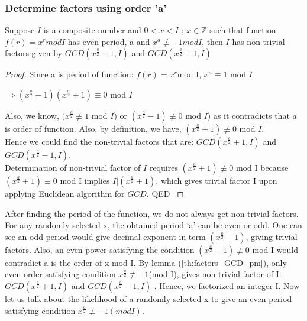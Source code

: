 \subsubsection{Determine factors using order 'a'}

 
\begin{theorem}
    Suppose $I$ is a composite number and $0<x< I$ ; $x \in \mathbb{Z}$ such that function $f(r)=x^r mod I$ has even period, a and $x^a \not \equiv -1 mod I$, then $I$ has non trivial factors given by $GCD(x^{\frac{a}{2}} -1, I ) $ and $GCD(x^{\frac{a}{2}} +1, I )$ \cite{Nielsen2002}
    \label{th:factors_GCD_pm}
\end{theorem}
\begin{proof}
    Since a is period of function: $f(r)=x^r $mod I, $x^a \equiv 1$ mod $I$ 
    \begin{center}
         $\Rightarrow (x^{\frac{a}{2}}-1) (x^{\frac{a}{2}} +1)\equiv 0$ mod $I$
    \end{center}
    Also, we know, $(x^{\frac{a}{2}} \not \equiv 1$ mod $I$) or $(x^{\frac{a}{2}}-1) \not\equiv 0$ mod $I$) as it contradicts that $a$ is order of function. Also, by definition, we have, $(x^{\frac{a}{2}} +1) \not\equiv 0$ mod $I$. 
    \\Hence we could find the non-trivial factors that are: $GCD(x^{\frac{a}{2}} + 1, I ) $ and $GCD(x^{\frac{a}{2}}-1, I ) $. 
    \\Determination of non-trivial factor of $I$ requires $(x^{\frac{a}{2}} + 1)\not\equiv 0$ mod I because $(x^{\frac{a}{2}} + 1) \equiv 0$ mod I implies $I|(x^{\frac{a}{2}} + 1) $, which gives trivial factor I upon applying Euclidean algorithm for $GCD$.	QED
    \label{factor}
\end{proof}
After finding the period of the function, we do not always get non-trivial factors. For any randomly selected x, the obtained period ‘a’ can be even or odd. One can see an odd period would give decimal exponent in term $(x^{\frac{a}{2}}-1) $, giving trivial factors. Also, an even power satisfying the condition $(x^{\frac{a}{2}}-1) \not \equiv0$ mod I would contradict a is the order of x mod I. By lemma (\ref{th:factors_GCD_pm}), only even order satisfying condition $x^{\frac{a}{2}}\not \equiv -1$(mod I), gives non trivial factor of I: $GCD(x^{\frac{a}{2}} + 1, I ) $ and $GCD(x^{\frac{a}{2}}-1, I ) $ . Hence, we factorized an integer I.
Now let us talk about the likelihood of a randomly selected x to give an even period satisfying condition $x^{\frac{a}{2}} \not \equiv -1(mod I) $.

